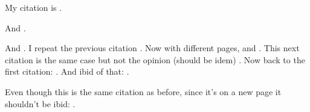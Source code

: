 \documentclass[english]{article}
\begin{document}
My citation is \cite{opinionmarbvmad}.

\lipsum[1]

And \cite{opinionbrownvboard}. 

\lipsum[2]

And \cite{opiniontwombly}. I repeat the previous citation
\cite{opiniontwombly}. Now with different pages, \cite[1--5]{opiniontwombly}
and \cite[6--8]{opiniontwombly}. This next citation is the same case but not
the opinion (should be idem) \cite{bellatlanticvtwombly}. Now back to the first
citation: \cite{opinionmarbvmad}. And ibid of that: \cite{opinionmarbvmad}.

\newpage

Even though this is the same citation as before, since it's on a new page it shouldn't be ibid: \cite{opinionmarbvmad}.

\printbibliography[title={Table of Cases}]

\end{document}

